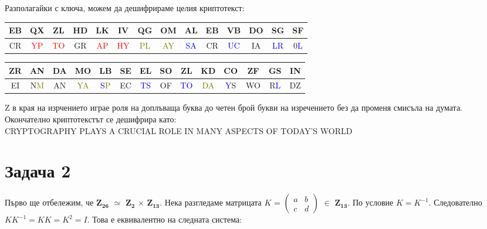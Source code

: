\documentclass{article}
\begin{document}
\justify
Разполагайки с ключа, можем да дешифрираме целия криптотекст:

\begin{center}
\begin{tabular}{|c|c|c|c|c|c|c|c|c|c|c|c|c|c|}
        \hline
        EB & QX & ZL & HD & LK & IV & QG & OM & AL & EB & VB & DO & SG & SF \\
        \hline
        CR & \textcolor{red}{YP} & \textcolor{red}{TO} & GR & \textcolor{red}{AP} & \textcolor{red}{HY} & \textcolor{olive}{PL} & \textcolor{olive}{AY} & \textcolor{blue}{SA} & CR & \textcolor{blue}{UC} & IA & \textcolor{blue}{LR} & 0\textcolor{blue}{L} \\
        \hline
        \end{tabular}
\end{center}

\begin{center}
\begin{tabular}{|c|c|c|c|c|c|c|c|c|c|c|c|c|c|}
        \hline
        ZR & AN & DA & MO & LB & SE & EL & SO & ZL & KD & CO & ZF & GS & IN \\
        \hline
        EI & N\textcolor{olive}{M} & AN & \textcolor{olive}{YA} & \textcolor{blue}{S}\textcolor{olive}{P} & EC & \textcolor{blue}{TS} & OF & \textcolor{blue}{TO} & \textcolor{olive}{DA} & \textcolor{blue}{Y}S & WO & R\textcolor{blue}{L} & DZ \\
        \hline
        \end{tabular}
\end{center}

\justify
Z в края на изрчението играе роля на доплъваща буква до четен брой букви на изречението без да променя смисъла на думата. Окончателно криптотекстът се дешифрира като: \\

\justify
CRYPTOGRAPHY PLAYS A CRUCIAL ROLE IN MANY ASPECTS OF TODAY'S WORLD

\section*{Задача 2}

\justify
Първо ще отбележим, че $\mathbf{Z_{26}}$ $\simeq$ $\mathbf{Z_2}$ $\times$ $\mathbf{Z_{13}}$. Нека разгледаме матрицата $K$ = $\begin{pmatrix}
                             a & b \\
                             c & d
                         \end{pmatrix}$
                         $\in$ $\mathbf{Z_{13}}$. 
По условие $K = K^{-1}$. Следователно $KK^{-1} = KK = K^2 = I$. Това е еквивалентно на следната система: 
\end{document}
